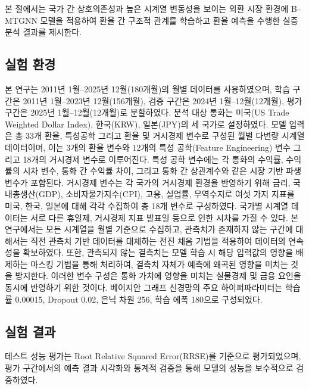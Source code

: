 \titlespacing*{\subsection}{0pt}{1.0em}{0.3em}
\titlespacing*{\paragraph}{0pt}{1.0em}{0.3em}

본 절에서는 국가 간 상호의존성과 높은 시계열 변동성을 보이는 외환 시장 환경에 B--MTGNN 모델을 적용하여 환율 간 구조적 관계를 학습하고 환율 예측을 수행한 실증 분석 결과를 제시한다.

\subsection{실험 환경}
본 연구는 2011년 1월--2025년 12월(180개월)의 월별 데이터를 사용하였으며, 학습 구간은 2011년 1월--2023년 12월(156개월), 검증 구간은 2024년 1월--12월(12개월), 평가 구간은 2025년 1월--12월(12개월)로 분할하였다. 분석 대상 통화는 미국(US Trade Weighted Dollar Index), 한국(KRW), 일본(JPY)의 세 국가로 설정하였다. 모델 입력은 총 33개 환율, 특성공학 그리고 환율 및 거시경제 변수로 구성된 월별 다변량 시계열 데이터이며, 이는 3개의 환율 변수와 12개의 특성 공학(Feature Engineering) 변수 그리고 18개의 거시경제 변수로 이루어진다. 특성 공학 변수에는 각 통화의 수익률, 수익률의 시차 변수, 통화 간 수익률 차이, 그리고 통화 간 상관계수와 같은 시장 기반 파생 변수가 포함된다. 거시경제 변수는 각 국가의 거시경제 환경을 반영하기 위해 금리, 국내총생산(GDP), 소비자물가지수(CPI), 고용, 실업률, 무역수지로 여섯 가지 지표를 미국, 한국, 일본에 대해 각각 수집하여 총 18개 변수로 구성하였다. 국가별 시계열 데이터는 서로 다른 휴일제, 거시경제 지표 발표일 등으로 인한 시차를 가질 수 있다. 본 연구에서는 모든 시계열을 월별 기준으로 수집하고, 관측치가 존재하지 않는 구간에 대해서는 직전 관측치 기반 데이터를 대체하는 전진 채움 기법을 적용하여 데이터의 연속성을 확보하였다. 또한, 관측되지 않는 결측치는 모델 학습 시 해당 입력값의 영향을 배제하는 마스킹 기법을 통해 처리하여, 결측치 자체가 예측에 왜곡된 영향을 미치는 것을 방지한다. 이러한 변수 구성은 통화 가치에 영향을 미치는 실물경제 및 금융 요인을 동시에 반영하기 위한 것이다.
베이지안 그래프 신경망의 주요 하이퍼파라미터는 학습률 0.00015, Dropout 0.02, 은닉 차원 256, 학습 에폭 180으로 구성되었다. 

\subsection{실험 결과}
테스트 성능 평가는 Root Relative Squared Error(RRSE)를 기준으로 평가되었으며, 평가 구간에서의 예측 결과 시각화와 통계적 검증을 통해 모델의 성능을 보수적으로 검증하였다.

